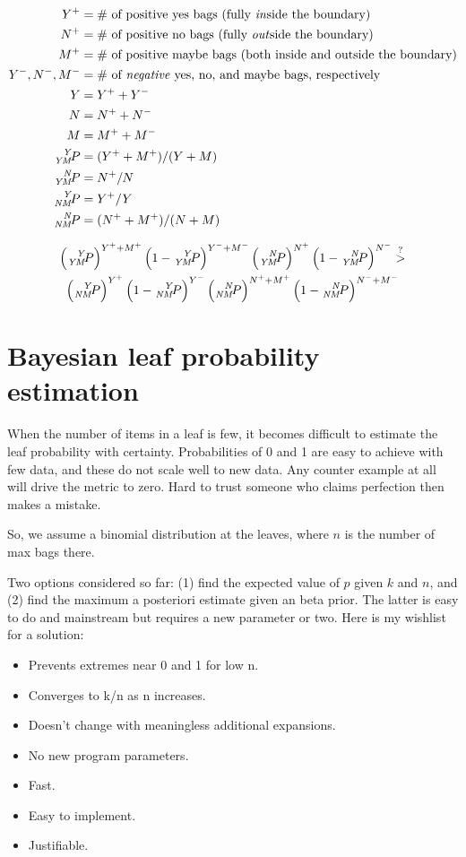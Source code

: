 \documentclass[12pt,twoside]{article}
\newcommand{\term}[1]{\emph{#1}}
\newcommand{\sspre}[3]{\ce{^{\mathit{#2}}_{\mathit{#3}}}\hspace{-1pt}#1}
\begin{document}
\begin{align*}
  Y^+ &= \text{\# of positive yes bags (fully \emph{in}side the boundary)} \\
  N^+ &= \text{\# of positive no bags (fully \emph{out}side the boundary)} \\
  M^+ &=
    \text{\# of positive maybe bags (both inside and outside the boundary)} \\
  Y^-, N^-, M^- &=
    \text{\# of \term{negative} yes, no, and maybe bags, respectively} \\
  Y &= Y^+ + Y^- \\
  N &= N^+ + N^- \\
  M &= M^+ + M^- \\
  \sspre{P}{Y}{YM} &= (Y^+ + M^+) / (Y + M) \\
  \sspre{P}{N}{YM} &= N^+ / N \\
  \sspre{P}{Y}{NM} &= Y^+ / Y \\
  \sspre{P}{N}{NM} &= (N^+ + M^+) / (N + M)
\end{align*}

\begin{multline}
  \left(\sspre{P}{Y}{YM}\right)^{Y^+ + M^+}
  \left(1 - \sspre{P}{Y}{YM}\right)^{Y^- + M^-}
  \left(\sspre{P}{N}{YM}\right)^{N^+}
  \left(1 - \sspre{P}{N}{YM}\right)^{N^-}
  \stackrel{?}{>} \\
  \left(\sspre{P}{Y}{NM}\right)^{Y^+}
  \left(1 - \sspre{P}{Y}{NM}\right)^{Y^-}
  \left(\sspre{P}{N}{NM}\right)^{N^+ + M^+}
  \left(1 - \sspre{P}{N}{NM}\right)^{N^- + M^-}
\end{multline}


\section{Bayesian leaf probability estimation}

When the number of items in a leaf is few, it becomes difficult to estimate the
leaf probability with certainty. Probabilities of 0 and 1 are easy to achieve
with few data, and these do not scale well to new data. Any counter example at
all will drive the metric to zero. Hard to trust someone who claims perfection
then makes a mistake.

So, we assume a binomial distribution at the leaves, where $n$ is the number of
max bags there.

Two options considered so far: (1) find the expected value of $p$ given $k$ and
$n$, and (2) find the maximum a posteriori estimate given an beta prior. The
latter is easy to do and mainstream but requires a new parameter or two. Here is
my wishlist for a solution:

\begin{itemize}
\item Prevents extremes near 0 and 1 for low n.
\item Converges to k/n as n increases.
\item Doesn't change with meaningless additional expansions.
\item No new program parameters.
\item Fast.
\item Easy to implement.
\item Justifiable.
\end{itemize}
\end{document}
